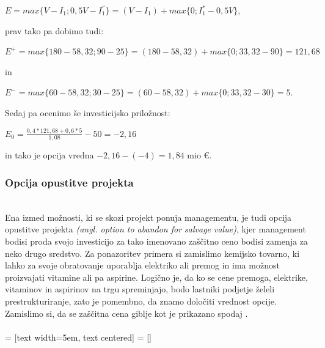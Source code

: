 \documentclass[12pt, a4paper]{amsart}
\theoremstyle{definition} %
\theoremstyle{plain} %
\begin{document}
\begin{center}
$E = max\{V - I_1; 0,5V - I^{''}_1\} = (V-I_1) + max\{0; I^*_1-0,5V\}$,
\end{center}
prav tako pa dobimo tudi:\\
\begin{center}
$E^+ = max\{180-58,32; 90-25\} = (180-58,32) + max\{0; 33,32-90\}= 121,68$
\end{center}
in
\begin{center}
$E^- = max\{60-58,32; 30-25\} = (60-58,32) +  max\{0; 33,32-30\} = 5$.
\end{center}

Sedaj pa ocenimo še investicijsko priložnost:\\
\begin{center}
$E_0 = \tfrac{0,4 * 121,68 + 0,6 * 5}{1,08} - 50 = -2,16 $
\end{center}
in tako je opcija vredna $-2,16-(-4) = 1,84$ mio €. \\

\subsubsection{Opcija opustitve projekta}
\cite[str. 166, 167]{Trigeorgis}\\
Ena izmed možnosti, ki se skozi projekt ponuja managementu, je tudi opcija opustitve projekta \textit{(angl. option to abandon for salvage value)}, kjer management bodisi proda svojo investicijo za tako imenovano zaščitno ceno bodisi zamenja za neko drugo sredstvo. Za ponazoritev primera si zamislimo kemijsko tovarno, ki lahko za svoje obratovanje uporablja elektriko ali premog in ima možnost proizvajati vitamine ali pa aspirine. Logično je, da ko se cene premoga, elektrike, vitaminov in aspirinov na trgu spreminjajo, bodo lastniki podjetje želeli prestrukturiranje, zato je pomembno, da znamo določiti vrednost opcije. Zamislimo si, da se zaščitna cena giblje kot je prikazano spodaj . \\
\\

 = [text width=5em, text centered]
 = []
\end{document}
